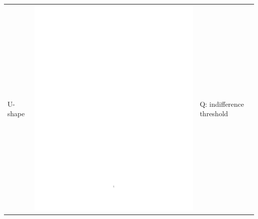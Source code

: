 \begin{enumerate}
\begin{table}[h!]
\begin{center}
\begin{tabular}{|l|c|b{4.2cm}|}
\hline U-shape & \includegraphics[page=2,trim=7.5cm 14cm 5cm 7cm,clip,scale=0.4]{prom_ushape_pdf} & Q: indifference threshold\\

\end{tabular}
\end{center}
\end{table}
\end{enumerate}
